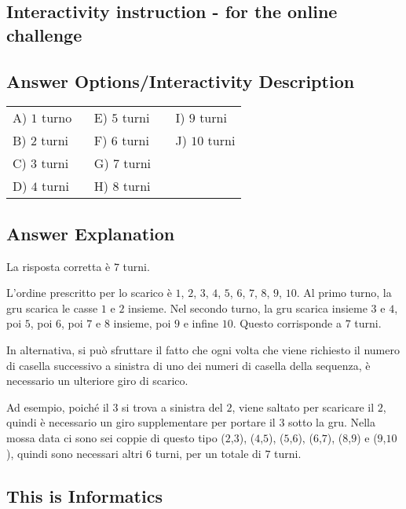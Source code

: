\documentclass[a4paper,11pt]{report}
\newcommand{\taskGraphicsFolder}{..}
\begin{document}
\subsection*{Interactivity instruction - for the online challenge}

\begingroup
\renewcommand{\arraystretch}{1.5}
\subsection*{Answer Options/Interactivity Description}

\begin{tabular}{ @{} l l l @{} }
  A) $1$ turno & E) $5$ turni & I) $9$ turni \\ 
  B) $2$ turni & F) $6$ turni & J) $10$ turni \\ 
  C) $3$ turni & G) $7$ turni &  \\ 
  D) $4$ turni ${~~~}$ & H) $8$ turni ${~~~}$ & 
\end{tabular}

\endgroup

\subsection*{Answer Explanation}

La risposta corretta è $7$ turni.

L’ordine prescritto per lo scarico è $1$, $2$, $3$, $4$, $5$, $6$, $7$, $8$, $9$, $10$. Al primo turno, la gru scarica le casse $1$ e $2$ insieme. Nel secondo turno, la gru scarica insieme $3$ e $4$, poi $5$, poi $6$, poi $7$ e $8$ insieme, poi $9$ e infine $10$. Questo corrisponde a $7$ turni.

In alternativa, si può sfruttare il fatto che ogni volta che viene richiesto il numero di casella successivo a sinistra di uno dei numeri di casella della sequenza, è necessario un ulteriore giro di scarico.

{\centering%
\par}

Ad esempio, poiché il $3$ si trova a sinistra del $2$, viene saltato per scaricare il $2$, quindi è necessario un giro supplementare per portare il $3$ sotto la gru. Nella mossa data ci sono sei coppie di questo tipo ($2$,$3$), ($4$,$5$), ($5$,$6$), ($6$,$7$), ($8$,$9$) e ($9$,$10$), quindi sono necessari altri $6$ turni, per un totale di $7$ turni.


\subsection*{This is Informatics}
\end{document}
